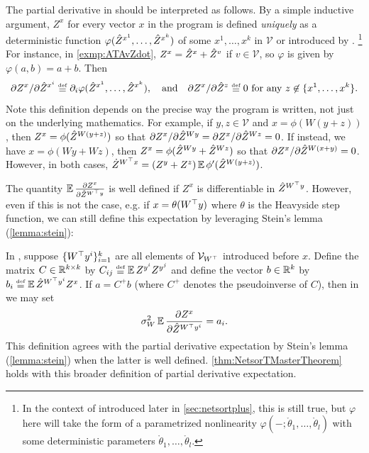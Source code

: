 \documentclass[main.tex]{subfiles}
\begin{document}
\begin{rem}\label{rem:PartialDer}
    The partial derivative in  should be interpreted as follows.
    By a simple inductive argument, $Z^x$ for every vector $x$ in the program is defined \emph{uniquely} as a deterministic function $\varphi(\hat Z^{x^1}, \ldots, \hat Z^{x^k})$ of some $x^1, \ldots, x^k$ in $\mathcal V$ or introduced by .%
    \footnote{In the context of \netsortplus{} introduced later in \cref{sec:netsortplus}, this is still true, but $\varphi$ here will take the form of a parametrized nonlinearity $\varphi(-;\mathring \theta_1, \ldots, \mathring \theta_l)$ with some deterministic parameters $\mathring \theta_1, \ldots, \mathring \theta_l$.}
    For instance, in \cref{exmp:ATAvZdot}, $Z^x = \hat Z^x + \hat Z^v$ if $v \in \mathcal V$, so $\varphi$ is given by $\varphi(a, b) = a + b$.
    Then
    \begin{equation*}
        \partial Z^x / \partial \Zhat^{x^i} \defeq \partial_i \varphi(\Zhat^{x^1}, \ldots, \Zhat^{x^k}), \quad \text{and} \quad \partial Z^x / \partial \Zhat^z \defeq 0 \text{ for any } z \not\in\{x^1, \ldots, x^k\}.
    \end{equation*}
    Note this definition depends on the precise way the program is written, not just on the underlying mathematics.
    For example, if $y,z \in \mathcal V$ and $x = \phi(W(y+z))$, then $Z^x = \phi(\hat Z^{W(y+z)})$ so that $\partial Z^x/\partial \hat Z^{Wy} = \partial Z^x/\partial \hat Z^{Wz} = 0$.
    If instead, we have $x = \phi(Wy+Wz)$, then $Z^x = \phi(\hat Z^{Wy} + \hat Z^{Wz})$ so that $\partial Z^x/\partial \hat Z^{W(x+y)} = 0$.
    However, in both cases, $\dot Z^{W^\top x} = (Z^y + Z^z)\operatorname*{\mathbb{E}} \phi'(\hat Z^{W(y+z)})$.
\end{rem}

\begin{rem}\label{rem:ExpectationPartialDer}
    The quantity $\operatorname*{\mathbb{E}}\frac{\partial Z^{x}}{\partial\hat{Z}^{W^{\top}y}}$ is well defined if $Z^{x}$ is differentiable in $\hat{Z}^{W^{\top}y}$. However, even if this is not the case, e.g. if $x=\theta(W^\top y)$ where $\theta$ is the Heavyside step function, we can still define this expectation by leveraging Stein's lemma (\cref{lemma:stein}):
    
    In , suppose $\{W^{\top}y^{i}\}_{i=1}^{k}$ are all elements of $\mathcal V_{W^\top}$ introduced before $x$.
    Define the matrix $C\in\mathbb{R}^{k\times k}$ by $C_{ij}\defeq \EV Z^{y^{i}}Z^{y^{j}}$ and define the vector $b\in\mathbb{R}^{k}$ by $b_{i}\defeq \EV\hat{Z}^{W^{\trsp}y^{i}}Z^{x}$. If $a=C^{+}b$ (where $C^{+}$ denotes the pseudoinverse of $C$), then in  we may set
    \begin{equation}
    \sigma_{W}^{2}\EV\frac{\partial Z^{x}}{\partial\hat{Z}^{W^{\trsp}y^{i}}}=a_{i}.\label{eq:ExpectationPartialDer}
    \end{equation}
    This definition agrees with the partial derivative expectation by Stein's lemma (\cref{lemma:stein}) when the latter is well defined.
    \cref{thm:NetsorTMasterTheorem} holds with this broader definition of partial derivative expectation.
\end{rem}
    
\end{document}
